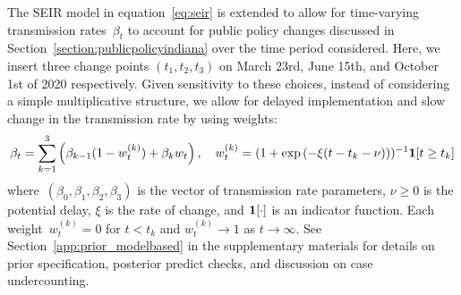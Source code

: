 \documentclass[11pt]{amsart}
\numberwithin{equation}{section}
\theoremstyle{plain}
\begin{document}
 The SEIR model in equation~\eqref{eq:seir} is extended to allow for time-varying transmission rates~$\beta_t$ to account for public policy changes discussed in Section~\ref{section:publicpolicyindiana} over the time period considered.  Here, we insert three change points $(t_1,t_2,t_3)$ on March 23rd, June 15th, and October 1st of 2020 respectively.  Given sensitivity to these choices, instead of considering a simple multiplicative structure, we allow for delayed implementation and slow change in the transmission rate by using weights:
 $$
 \beta_t = \sum_{k=1}^{3} \left(\beta_{k-1} (1-w^{(k)}_t ) + \beta_{k} w_t\right),\quad w^{(k)}_t = (1 + \exp \left( -\xi (t - t_k - \nu) \right))^{-1} {\bf 1}[t \geq t_k]
 $$
 where~$(\beta_0,\beta_1, \beta_2, \beta_3)$ is the vector of transmission rate parameters, $\nu \geq 0$ is the potential delay, $\xi$ is the rate of change, and ${\bf 1}[\cdot]$ is an indicator function.  Each weight~$w_t^{(k)} = 0$ for $t < t_k$ and $w_t^{(k)} \to 1$ as $t \to \infty$. See Section~\ref{app:prior_modelbased} in the supplementary materials for details on prior specification, posterior predict checks, and discussion on case undercounting.

\end{document}
